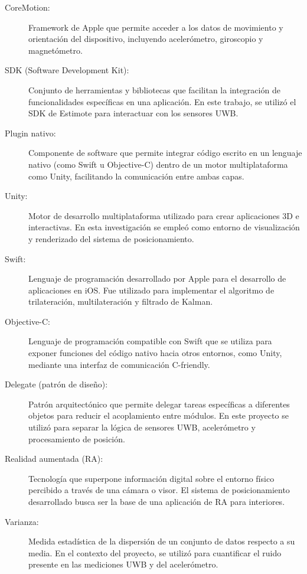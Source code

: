 \begin{description}
\item[CoreMotion:] Framework de Apple que permite acceder a los datos de movimiento y orientación del dispositivo, incluyendo acelerómetro, giroscopio y magnetómetro.

\item[SDK (Software Development Kit):] Conjunto de herramientas y bibliotecas que facilitan la integración de funcionalidades específicas en una aplicación. En este trabajo, se utilizó el SDK de Estimote para interactuar con los sensores UWB.

\item[Plugin nativo:] Componente de software que permite integrar código escrito en un lenguaje nativo (como Swift u Objective-C) dentro de un motor multiplataforma como Unity, facilitando la comunicación entre ambas capas.

\item[Unity:] Motor de desarrollo multiplataforma utilizado para crear aplicaciones 3D e interactivas. En esta investigación se empleó como entorno de visualización y renderizado del sistema de posicionamiento.

\item[Swift:] Lenguaje de programación desarrollado por Apple para el desarrollo de aplicaciones en iOS. Fue utilizado para implementar el algoritmo de trilateración, multilateración y filtrado de Kalman.

\item[Objective-C:] Lenguaje de programación compatible con Swift que se utiliza para exponer funciones del código nativo hacia otros entornos, como Unity, mediante una interfaz de comunicación C-friendly.

\item[Delegate (patrón de diseño):] Patrón arquitectónico que permite delegar tareas específicas a diferentes objetos para reducir el acoplamiento entre módulos. En este proyecto se utilizó para separar la lógica de sensores UWB, acelerómetro y procesamiento de posición.

\item[Realidad aumentada (RA):] Tecnología que superpone información digital sobre el entorno físico percibido a través de una cámara o visor. El sistema de posicionamiento desarrollado busca ser la base de una aplicación de RA para interiores.

\item[Varianza:] Medida estadística de la dispersión de un conjunto de datos respecto a su media. En el contexto del proyecto, se utilizó para cuantificar el ruido presente en las mediciones UWB y del acelerómetro.


\end{description}
